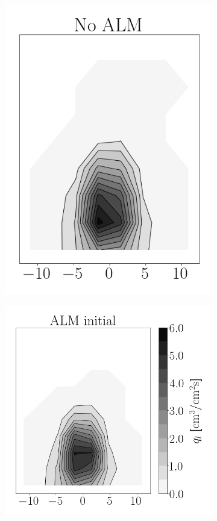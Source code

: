 \begin{figure}[h!]
\begin{subfigure}[b]{0.2\textwidth}
   \includegraphics[scale=0.4]{./part2_developments/figures_ch6_lagrangian_JICF/params_gaseous_initial_conditions/maps/no_ALM_flux}
\end{subfigure}
\hspace*{0.00in}
\begin{subfigure}[b]{0.2\textwidth}
	\flushleft
   \includegraphics[scale=0.4]{./part2_developments/figures_ch6_lagrangian_JICF/params_gaseous_initial_conditions/maps/ALM_initial_flux}
\end{subfigure}


\end{figure}
